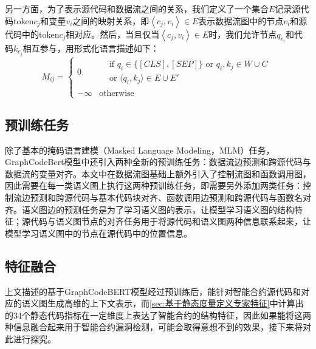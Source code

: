 另一方面，为了表示源代码和数据流之间的关系，我们定义了一个集合$E$记录源代码token$c_j$和变量$v_i$之间的映射关系，即$\left\langle c_j,v_i \right\rangle \in E$表示数据流图中的节点$v_i$和源代码中的token$c_j$相对应。然后，当且仅当$\left\langle c_j,v_i \right\rangle \in E$时，我们允许节点$q_{v_i}$和代码$k_{c_j}$相互参与，用形式化语言描述如下：
\begin{equation}
    M_{ij} =
    \begin{cases}
        0 & \begin{aligned}
               &\text{if } q_i \in \{[CLS], [SEP]\} \text{ or } q_i, k_j \in W \cup C \\
               &\text{or } \langle q_i, k_j \rangle \in E \cup E'
           \end{aligned} \\
        -\infty & \text{otherwise}
    \end{cases}
    \label{eq:mask}
\end{equation}

\subsection{预训练任务}
\label{sec:预训练任务}
除了基本的掩码语言建模（Masked Language Modeling，MLM）任务\cite{devlin2018bert}，GraphCodeBert模型中还引入两种全新的预训练任务：数据流边预测和跨源代码与数据流的变量对齐。本文中在数据流图基础上额外引入了控制流图和函数调用图，因此需要在每一类语义图上执行这两种预训练任务，即需要另外添加两类任务：控制流边预测和跨源代码与基本代码块对齐、函数调用边预测和跨源代码与函数名对齐。语义图边的预测任务是为了学习语义图的表示，让模型学习语义图的结构特征；源代码与语义图节点的对齐任务用于将源代码和语义图两种信息联系起来，让模型学习语义图中的节点在源代码中的位置信息。

\subsection{特征融合}
\label{sec:特征融合}
上文描述的基于GraphCodeBERT模型经过预训练后，能针对智能合约源代码和对应的语义图生成高维的上下文表示，而\autoref{sec:基于静态度量定义专家特征}中计算出的34个静态代码指标在一定维度上表达了智能合约的结构特征，因此如果能将这两种信息融合起来用于智能合约漏洞检测，可能会取得意想不到的效果，接下来将对此进行探究。

